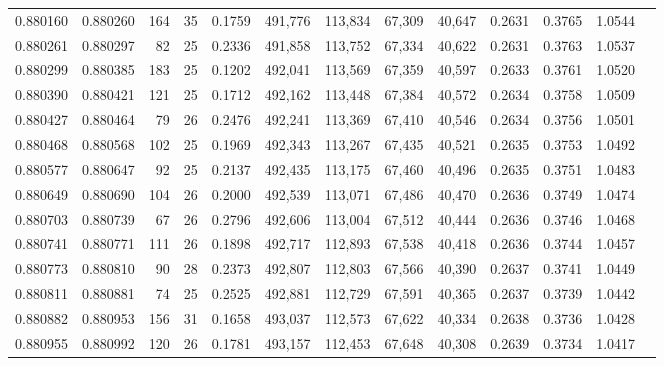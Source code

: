 \begin{tabular}{rrrrrrrrrrrrr}
0.880160 & 0.880260 &   164 &  35 &                                     0.1759 & 491,776 & 113,834 &  67,309 &  40,647 & 0.2631 & 0.3765 & 1.0544 \\
0.880261 & 0.880297 &    82 &  25 &                                     0.2336 & 491,858 & 113,752 &  67,334 &  40,622 & 0.2631 & 0.3763 & 1.0537 \\
0.880299 & 0.880385 &   183 &  25 &                                     0.1202 & 492,041 & 113,569 &  67,359 &  40,597 & 0.2633 & 0.3761 & 1.0520 \\
0.880390 & 0.880421 &   121 &  25 &                                     0.1712 & 492,162 & 113,448 &  67,384 &  40,572 & 0.2634 & 0.3758 & 1.0509 \\
0.880427 & 0.880464 &    79 &  26 &                                     0.2476 & 492,241 & 113,369 &  67,410 &  40,546 & 0.2634 & 0.3756 & 1.0501 \\
0.880468 & 0.880568 &   102 &  25 &                                     0.1969 & 492,343 & 113,267 &  67,435 &  40,521 & 0.2635 & 0.3753 & 1.0492 \\
0.880577 & 0.880647 &    92 &  25 &                                     0.2137 & 492,435 & 113,175 &  67,460 &  40,496 & 0.2635 & 0.3751 & 1.0483 \\
0.880649 & 0.880690 &   104 &  26 &                                     0.2000 & 492,539 & 113,071 &  67,486 &  40,470 & 0.2636 & 0.3749 & 1.0474 \\
0.880703 & 0.880739 &    67 &  26 &                                     0.2796 & 492,606 & 113,004 &  67,512 &  40,444 & 0.2636 & 0.3746 & 1.0468 \\
0.880741 & 0.880771 &   111 &  26 &                                     0.1898 & 492,717 & 112,893 &  67,538 &  40,418 & 0.2636 & 0.3744 & 1.0457 \\
0.880773 & 0.880810 &    90 &  28 &                                     0.2373 & 492,807 & 112,803 &  67,566 &  40,390 & 0.2637 & 0.3741 & 1.0449 \\
0.880811 & 0.880881 &    74 &  25 &                                     0.2525 & 492,881 & 112,729 &  67,591 &  40,365 & 0.2637 & 0.3739 & 1.0442 \\
0.880882 & 0.880953 &   156 &  31 &                                     0.1658 & 493,037 & 112,573 &  67,622 &  40,334 & 0.2638 & 0.3736 & 1.0428 \\
0.880955 & 0.880992 &   120 &  26 &                                     0.1781 & 493,157 & 112,453 &  67,648 &  40,308 & 0.2639 & 0.3734 & 1.0417 \\

\end{tabular}
